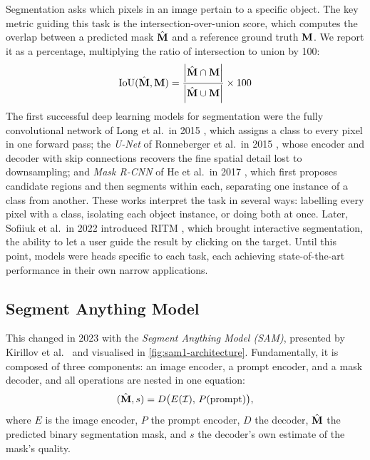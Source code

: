 Segmentation asks which pixels in an image pertain to a specific object. The key metric guiding this task is the intersection-over-union score, which computes the overlap between a predicted mask $\hat{\mathbf{M}}$ and a reference ground truth $\mathbf{M}$. We report it as a percentage, multiplying the ratio of intersection to union by 100:
\begin{equation}
    \text{IoU}(\hat{\mathbf{M}}, \mathbf{M}) = \frac{\left|\hat{\mathbf{M}} \cap \mathbf{M}\right|} {\left|\hat{\mathbf{M}} \cup \mathbf{M}\right|} \times 100
\label{eq:iou}
\end{equation}
The first successful deep learning models for segmentation were the fully convolutional network of Long et al.\ in 2015 \cite{long2015fcn}, which assigns a class to every pixel in one forward pass; the \textit{U-Net} of Ronneberger et al.\ in 2015 \cite{ronneberger2015unet}, whose encoder and decoder with skip connections recovers the fine spatial detail lost to downsampling; and \textit{Mask R-CNN} of He et al.\ in 2017 \cite{he2017maskrcnn}, which first proposes candidate regions and then segments within each, separating one instance of a class from another. These works interpret the task in several ways: labelling every pixel with a class, isolating each object instance, or doing both at once. Later, Sofiiuk et al.\ in 2022 introduced RITM \cite{sofiiuk2021revivingiterativetrainingmask}, which brought interactive segmentation, the ability to let a user guide the result by clicking on the target. Until this point, models were heads specific to each task, each achieving state-of-the-art performance in their own narrow applications.

\subsection{Segment Anything Model}
\label{subsec:sam}

This changed in 2023 with the \textit{Segment Anything Model (SAM)}, presented by Kirillov et al.\ \cite{kirillov2023sam} and visualised in \cref{fig:sam1-architecture}. Fundamentally, it is composed of three components: an image encoder, a prompt encoder, and a mask decoder, and all operations are nested in one equation:
\begin{equation}
(\hat{\mathbf{M}}, s) = D\big(E(\mathcal{I}),\, P(\text{prompt})\big),
\label{eq:sam-decoder}
\end{equation}
where $E$ is the image encoder, $P$ the prompt encoder, $D$ the decoder, $\hat{\mathbf{M}}$ the predicted binary segmentation mask, and $s$ the decoder's own estimate of the mask's quality.

